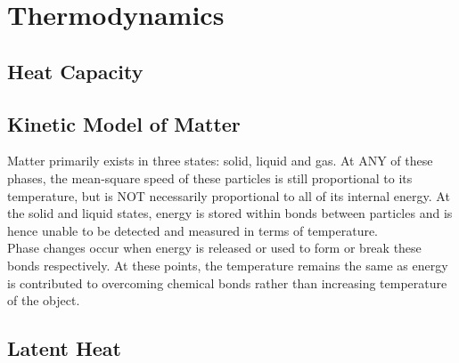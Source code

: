 \documentclass[../main]{subfiles}
\begin{document}
\section{Thermodynamics}

	\subsection{Heat Capacity}





	\subsection{Kinetic Model of Matter}

	Matter primarily exists in three states: solid, liquid and gas. At ANY of these phases, the mean-square speed of these particles is still proportional to its temperature, but is NOT necessarily proportional to all of its internal energy. At the solid and liquid states, energy is stored within bonds between particles and is hence unable to be detected and measured in terms of temperature. \\

	Phase changes occur when energy is released or used to form or break these bonds respectively. At these points, the temperature remains the same as energy is contributed to overcoming chemical bonds rather than increasing temperature of the object.

	\subsection{Latent Heat}


\end{document}
